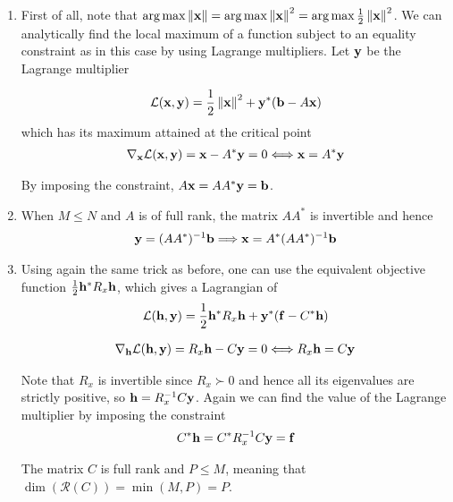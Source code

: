 \documentclass{article}
\begin{document}
    \begin{enumerate}[label=(\roman*)]
        \item First of all, note that $\operatorname*{arg\,max} \left\lVert\mathbf{x}\right\rVert=\operatorname*{arg\,max} \left\lVert\mathbf{x}\right\rVert^2 = \operatorname*{arg\,max} \frac{1}{2}\left\lVert\mathbf{x}\right\rVert^2$. We can analytically find the local maximum of a function subject to an equality constraint as in this case by using Lagrange multipliers. Let $\mathbf{y}$ be the Lagrange multiplier
        
        \begin{align}
            \mathcal{L} (\mathbf{x}, \mathbf{y}) = \frac{1}{2}\left\lVert\mathbf{x}\right\rVert^2 + \mathbf{y}^* (\mathbf{b} - A \mathbf{x})
        \end{align}
        which has its maximum attained at the critical point
        \begin{align}
            \nabla_{\mathbf{x}} \mathcal{L}(\mathbf{x}, \mathbf{y}) = \mathbf{x} - A^* \mathbf{y} = 0 \Longleftrightarrow \mathbf{x} = A^* \mathbf{y}
        \end{align}
        
        By imposing the constraint, $A\mathbf{x}= A A^* \mathbf{y}= \mathbf{b}$.
        \item When $M \leq N$ and $A$ is of full rank, the matrix $A A^*$ is invertible and hence
        \begin{align}
            \mathbf{y} = (A A^*)^{-1} \mathbf{b} \Longrightarrow \mathbf{x} = A^* (A A^*)^{-1} \mathbf{b}
        \end{align}
        \item Using again the same trick as before, one can use the equivalent objective function $\frac{1}{2}\mathbf{h}^* R_x \mathbf{h}$, which gives a Lagrangian of
        \begin{align}
             \mathcal{L} (\mathbf{h}, \mathbf{y}) = \frac{1}{2}\mathbf{h}^* R_x \mathbf{h} + \mathbf{y}^* (\mathbf{f} - C^* \mathbf{h})
        \end{align}
        
        \begin{align}
            \nabla_{\mathbf{h}} \mathcal{L}(\mathbf{h}, \mathbf{y}) = R_x \mathbf{h} - C \mathbf{y} = 0 \Longleftrightarrow R_x \mathbf{h} = C \mathbf{y}
        \end{align}
        
        Note that $R_x$ is invertible since $R_x \succ 0$ and hence all its eigenvalues are strictly positive, so $\mathbf{h} = R_x^{-1} C \mathbf{y}$. Again we can find the value of the Lagrange multiplier by imposing the constraint
        \begin{align}
            C^* \mathbf{h} = C^* R_x^{-1} C \mathbf{y} = \mathbf{f}
        \end{align}
        
        \begin{assumption}
            The matrix $C$ is full rank and $P\leq M$, meaning that $\dim (\mathcal{R}(C)) = \min(M,P)= P$.
            \label{ass:1}
        \end{assumption}
        

\end{enumerate}
\end{document}
